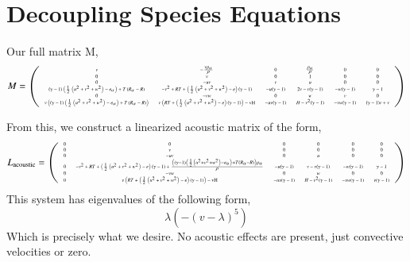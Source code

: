\documentclass[letterpaper,11pt,nointlimits,reqno,draft]{amsart}
\begin{document}
\section{Decoupling Species Equations}
Our full matrix M,
\begin{equation}
\tiny
M = 
\left(
\begin{array}{cccccc}
 v & -\frac{v \rho _{\alpha }}{\rho } & 0 & \frac{\rho _{\alpha }}{\rho } & 0 & 0 \\
 0 & v & 0 & 1 & 0 & 0 \\
 0 & -u v & v & u & 0 & 0 \\
 (\gamma -1) \left(\frac{1}{2} \left(u^2+v^2+w^2\right)-e_{\alpha }\right)+T \left(R_{\alpha }-R\right) & -v^2+R T+\left(\frac{1}{2} \left(u^2+v^2+w^2\right)-e\right) (\gamma
   -1) & -u (\gamma -1) & 2 v-v (\gamma -1) & -w (\gamma -1) & \gamma -1 \\
 0 & -v w & 0 & w & v & 0 \\
 v \left((\gamma -1) \left(\frac{1}{2} \left(u^2+v^2+w^2\right)-e_{\alpha }\right)+T \left(R_{\alpha }-R\right)\right) & v \left(R T+\left(\frac{1}{2}
   \left(u^2+v^2+w^2\right)-e\right) (\gamma -1)\right)-\text{vH} & -u v (\gamma -1) & H-v^2 (\gamma -1) & -v w (\gamma -1) & (\gamma -1) v+v
\end{array}
\right)
\end{equation}

From this, we construct a linearized acoustic matrix of the form,
\begin{equation}
\tiny
L_{\text{acoustic}} = 
\left(
\begin{array}{cccccc}
 0 & 0 & 0 & 0 & 0 & 0 \\
 0 & v & 0 & 0 & 0 & 0 \\
 0 & -u v & 0 & u & 0 & 0 \\
 0 & -v^2+R T+\left(\frac{1}{2} \left(u^2+v^2+w^2\right)-e\right) (\gamma -1)+\frac{\left((\gamma -1) \left(\frac{1}{2} \left(u^2+v^2+w^2\right)-e_{\alpha }\right)+T
   \left(R_{\alpha }-R\right)\right) \rho _{\alpha }}{\rho } & -u (\gamma -1) & v-v (\gamma -1) & -w (\gamma -1) & \gamma -1 \\
 0 & -v w & 0 & w & 0 & 0 \\
 0 & v \left(R T+\left(\frac{1}{2} \left(u^2+v^2+w^2\right)-e\right) (\gamma -1)\right)-\text{vH} & -u v (\gamma -1) & H-v^2 (\gamma -1) & -v w (\gamma -1) & v (\gamma -1)
\end{array}
\right)
\end{equation}
This system has eigenvalues of the following form,
\begin{equation}
 \lambda  \left(-(v-\lambda )^5\right)
\end{equation}
Which is precisely what we desire. No acoustic effects are present, just
convective velocities or zero.
\end{document}
